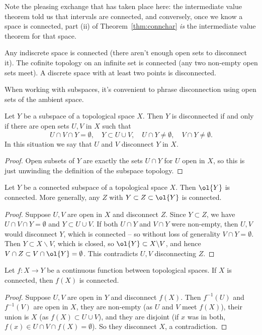 \documentclass[a4paper]{scrartcl}
\begin{document}
Note the pleasing exchange that has taken place here: the intermediate value theorem told us that intervals are connected, and conversely, once we know a space is connected, part (ii) of Theorem~\ref{thm:connchar} \emph{is} the intermediate value theorem for that space.

\begin{example}
    Any indiscrete space is connected (there aren't enough open sets to disconnect it). The cofinite topology on an infinite set is connected (any two non-empty open sets meet). A discrete space with at least two points is disconnected.
\end{example}

When working with subspaces, it's convenient to phrase disconnection using open sets of the ambient space.

\begin{lemma}
    Let $Y$ be a subspace of a topological space $X$. Then $Y$ is disconnected if and only if there are open sets $U, V$ in $X$ such that
    $$
    U \cap V \cap Y = \emptyset, \quad Y \subset U \cup V, \quad U \cap Y \neq \emptyset, \quad V \cap Y \neq \emptyset.
    $$
    In this situation we say that $U$ and $V$ disconnect $Y$ in $X$.
\end{lemma}
\begin{proof}
    Open subsets of $Y$ are exactly the sets $U \cap Y$ for $U$ open in $X$, so this is just unwinding the definition of the subspace topology.
\end{proof}

\begin{proposition}\label{prop:closureconn}
    Let $Y$ be a connected subspace of a topological space $X$. Then $\ol{Y}$ is connected. More generally, any $Z$ with $Y \subset Z \subset \ol{Y}$ is connected.
\end{proposition}
\begin{proof}
    Suppose $U, V$ are open in $X$ and disconnect $Z$. Since $Y \subset Z$, we have $U \cap V \cap Y = \emptyset$ and $Y \subset U \cup V$. If both $U \cap Y$ and $V \cap Y$ were non-empty, then $U, V$ would disconnect $Y$, which is connected -- so without loss of generality $V \cap Y = \emptyset$. Then $Y \subset X \backslash V$, which is closed, so $\ol{Y} \subset X \backslash V$, and hence $V \cap Z \subset V \cap \ol{Y} = \emptyset$. This contradicts $U, V$ disconnecting $Z$.
\end{proof}

\begin{theorem}
    Let $f: X \rightarrow Y$ be a continuous function between topological spaces. If $X$ is connected, then $f(X)$ is connected.
\end{theorem}
\begin{proof}
    Suppose $U, V$ are open in $Y$ and disconnect $f(X)$. Then $f^{-1}(U)$ and $f^{-1}(V)$ are open in $X$, they are non-empty (as $U$ and $V$ meet $f(X)$), their union is $X$ (as $f(X) \subset U \cup V$), and they are disjoint (if $x$ was in both, $f(x) \in U \cap V \cap f(X) = \emptyset$). So they disconnect $X$, a contradiction.
\end{proof}
\end{document}
